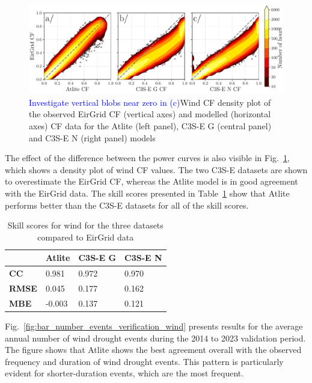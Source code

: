 \documentclass[a4paper, 11pt]{article}
\begin{document}
\begin{figure}[!ht]
	\centering
	\includegraphics[width=\textwidth]{verification_wind_contour}
	\caption{\textcolor{blue}{Investigate vertical blobs near zero in (c)}Wind CF density plot of the observed EirGrid CF (vertical axes) and modelled (horizontal axes) CF data for the Atlite  (left panel), C3S-E G (central panel) and C3S-E N (right panel) models}
	\label{fig:wind_verification_contour}
\end{figure}

The effect of the difference between the power curves is also visible in Fig.~\ref{fig:wind_verification_contour}, which shows a density plot of wind CF values. The two C3S-E datasets are shown to overestimate the EirGrid CF, whereas the Atlite model is in good agreement with the EirGrid data. The skill scores presented in Table~\ref{tab:wind_skill_scores} show that Atlite performs better than the C3S-E datasets for all of the skill scores. 

\begin{table}[!ht]
	\centering
	\begin{tabular}{l|lll|}
		\cline{2-4}
		& \textbf{Atlite} & \textbf{C3S-E G} & \textbf{C3S-E N} \\ \hline
		\multicolumn{1}{|l|}{\textbf{CC}}   & 0.981           & 0.972            & 0.970            \\ \hline
		\multicolumn{1}{|l|}{\textbf{RMSE}} & 0.045           & 0.177            & 0.162            \\ \hline
		\multicolumn{1}{|l|}{\textbf{MBE}}   & -0.003          & 0.137            & 0.121            \\ \hline
	\end{tabular}
	\caption{Skill scores for wind for the three datasets compared to EirGrid data}
	\label{tab:wind_skill_scores}
\end{table}

Fig.~\ref{fig:bar_number_events_verification_wind} presents results for the average annual number of wind drought events during the 2014 to 2023 validation period. The figure shows that Atlite shows the best agreement overall with the observed frequency and duration of wind drought events. This pattern is particularly evident for shorter-duration events, which are the most frequent.
\end{document}

